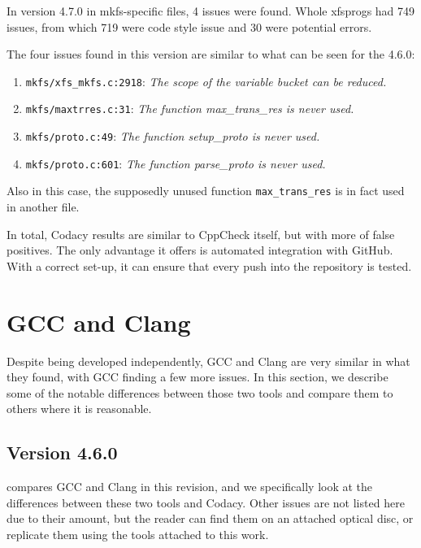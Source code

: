 In version 4.7.0 in mkfs-specific files, 4 issues were found. Whole
xfsprogs had 749 issues, from which 719 were code style issue and 30 were
potential errors.

The four issues found in this version are similar to what can be seen for the 4.6.0:
\begin{enumerate}
	\item {\tt mkfs/xfs\_mkfs.c:2918}: {\em The scope of the variable 
		bucket can be reduced.}
	\item {\tt mkfs/maxtrres.c:31}: {\em The function max\_trans\_res
		is never used.}
	\item {\tt mkfs/proto.c:49}: {\em The function  setup\_proto is
		never used.}
	\item {\tt mkfs/proto.c:601}: {\em The function  parse\_proto is
		never used.}
\end{enumerate}

Also in this case, the supposedly unused function {\tt max\_trans\_res} is
in fact used in another file.

In total, Codacy results are similar to CppCheck itself, but with more of false
positives. The only advantage it offers is automated integration with GitHub.
With a correct set-up, it can ensure that every push into the repository is
tested.

\section{GCC and Clang}\label{chap:results:gcc}

Despite being developed independently, GCC and Clang are very similar in what
they found, with GCC finding a few more issues. In this section, we describe
some of the notable differences between those two tools and compare them to
others where it is reasonable.

\subsection{Version 4.6.0}\label{chap:results:gcc:4.6}

 compares GCC and Clang in this revision, and we
specifically look at the differences between these two tools and Codacy.
Other issues are not listed here due to their amount, but the reader can find
them on an attached optical disc, or replicate them using the tools attached to
this work.

